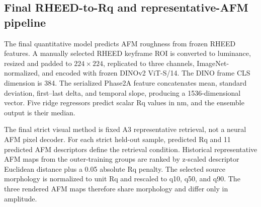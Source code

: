 \subsection{Final RHEED-to-Rq and representative-AFM pipeline}
The final quantitative model predicts AFM roughness from frozen RHEED features. A manually selected RHEED keyframe ROI is converted to luminance, resized and padded to $224\times224$, replicated to three channels, ImageNet-normalized, and encoded with frozen DINOv2 ViT-S/14. The DINO frame CLS dimension is 384. The serialized Phase2A feature concatenates mean, standard deviation, first--last delta, and temporal slope, producing a 1536-dimensional vector. Five ridge regressors predict scalar Rq values in nm, and the ensemble output is their median.

The final strict visual method is fixed A3 representative retrieval, not a neural AFM pixel decoder. For each strict held-out sample, predicted Rq and 11 predicted AFM descriptors define the retrieval condition. Historical representative AFM maps from the outer-training groups are ranked by z-scaled descriptor Euclidean distance plus a 0.05 absolute Rq penalty. The selected source morphology is normalized to unit Rq and rescaled to q10, q50, and q90. The three rendered AFM maps therefore share morphology and differ only in amplitude.
